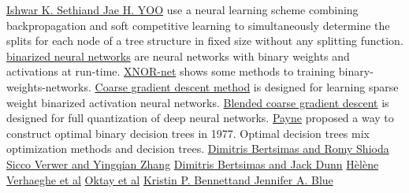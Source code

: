 \documentclass[UTF8]{article}
\begin{document}
\href{https://www.sciencedirect.com/science/article/abs/pii/S0031320397000058}{Ishwar K. Sethiand Jae H. YOO} use
a neural learning scheme combining backpropagation and soft competitive
learning to simultaneously determine the splits  for each node of a tree structure in fixed size
without any splitting function.
\href{http://simplecore-dev.intel.com/ai/wp-content/uploads/sites/71/1602.02830v3.pdf}{binarized neural networks}
are neural networks with binary weights and activations at run-time.
\href{https://www.xnor.ai/xnor-net}{XNOR-net} shows some methods to training binary-weights-networks.
\href{https://arxiv.org/pdf/1901.09731.pdf}{Coarse gradient descent method} is designed for learning
sparse weight binarized activation neural networks.
\href{https://www.math.uci.edu/~jxin/BCGD_RMS_2018.pdf}{Blended coarse gradient descent}
is designed for full quantization of deep neural networks.
\href{https://ieeexplore.ieee.org/document/1674938}{Payne}
proposed a way to construct optimal binary decision trees in 1977.
Optimal decision trees mix optimization methods and decision trees.
\href{https://ideas.repec.org/a/inm/oropre/v55y2007i2p252-271.html}{Dimitris Bertsimas and Romy Shioda}
\href{https://link.springer.com/chapter/10.1007/978-3-319-59776-8_8}{Sicco Verwer and Yingqian Zhang}
\href{http://jack.dunn.nz/papers/OptimalClassificationTrees.pdf}{Dimitris Bertsimas and Jack Dunn}
\href{http://genoweb.toulouse.inra.fr/~tschiex/CP2019/paper132post.pdf}{H\`{e}l\`{e}ne Verhaeghe et al}
\href{http://www.optimization-online.org/DB_FILE/2018/01/6404.pdf}{Oktay et al}
\href{https://www.researchgate.net/publication/2796065_Optimal_Decision_Trees}{Kristin P. Bennettand Jennifer A. Blue}
\end{document}
